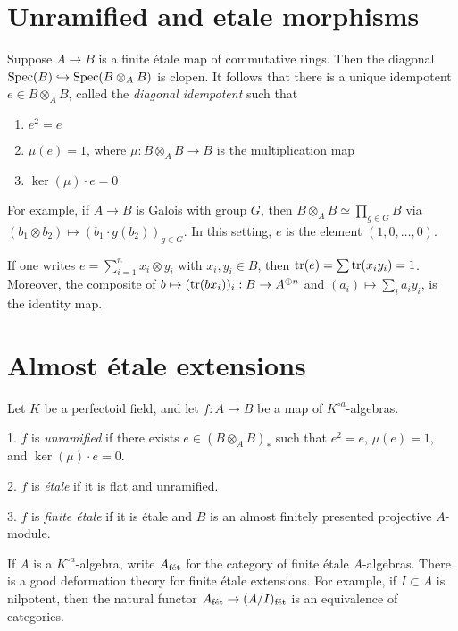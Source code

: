 \documentclass{article}
\begin{document}
\section{Unramified and etale morphisms}

Suppose $A\to B$ is a finite \'etale map of commutative rings. Then the 
diagonal $\operatorname{Spec}(B)\hookrightarrow \operatorname{Spec}(B\otimes_A B)$ is clopen. It follows 
that there is a unique idempotent $e\in B\otimes_A B$, called the \emph{diagonal 
idempotent} such that 
\begin{enumerate}
  \item $e^2=e$ 
  \item $\mu(e)=1$, where $\mu:B\otimes_A B\to B$ is the multiplication map 
  \item $\ker(\mu)\cdot e = 0$ 
\end{enumerate}

For example, if $A\to B$ is Galois with group $G$, then 
$B\otimes_A B\simeq \prod_{g\in G} B$ via 
$(b_1\otimes b_2)\mapsto (b_1\cdot g(b_2))_{g\in G}$. In this setting, $e$ is the 
element $(1,0,\dots,0)$. 

If one writes $e=\sum_{i=1}^n x_i\otimes y_i$ with $x_i,y_i\in B$, then 
$\operatorname{tr}(e) = \sum \operatorname{tr}(x_i y_i) = 1$. Moreover, the composite of 
$b\mapsto (\operatorname{tr}(b x_i))_i:B\to A^{\oplus n}$ and 
$(a_i)\mapsto \sum_i a_i y_i$, is the identity map. 




\section{Almost \'etale extensions}

Let $K$ be a perfectoid field, and let $f:A\to B$ be a map of 
$K^{\circ a}$-algebras. 

\begin{definition}
1. $f$ is \emph{unramified} if there exists $e\in (B\otimes_A B)_\ast$ such 
that $e^2=e$, $\mu(e)=1$, and $\ker(\mu)\cdot e=0$. 

2. $f$ is \emph{\'etale} if it is flat and unramified. 

3. $f$ is \emph{finite \'etale} if it is \'etale and $B$ is an almost finitely 
presented projective $A$-module. 
\end{definition}

If $A$ is a $K^{\circ a}$-algebra, write $A_{\textnormal{f\'et}}$ for the category of finite 
\'etale $A$-algebras. There is a good deformation theory for finite \'etale 
extensions. For example, if $I\subset A$ is nilpotent, then the natural functor 
$A_{\textnormal{f\'et}} \to (A/I)_{\textnormal{f\'et}}$ is an equivalence of categories. 
\end{document}
